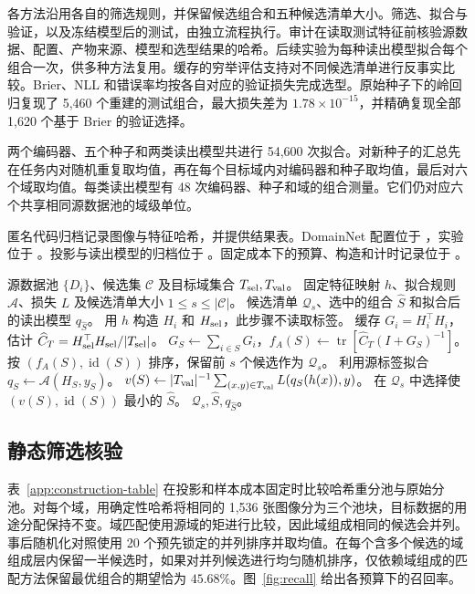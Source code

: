 \documentclass[UTF8,fontset=fandol,scheme=chinese,zihao=false,11pt,letterpaper]{ctexart}
\newcommand{\tr}{\operatorname{tr}}
\newcommand{\cC}{\mathcal{C}}
\newcommand{\cQ}{\mathcal{Q}}
\begin{document}
各方法沿用各自的筛选规则，并保留候选组合和五种候选清单大小。筛选、拟合与验证，以及冻结模型后的测试，由独立流程执行。审计在读取测试特征前核验源数据、配置、产物来源、模型和选型结果的哈希。后续实验为每种读出模型拟合每个组合一次，供多种方法复用。缓存的穷举评估支持对不同候选清单进行反事实比较。Brier、NLL 和错误率均按各自对应的验证损失完成选型。原始种子下的岭回归复现了 5,460 个重建的测试组合，最大损失差为 $1.78\times10^{-15}$，并精确复现全部 1,620 个基于 Brier 的验证选择。

两个编码器、五个种子和两类读出模型共进行 54,600 次拟合。对新种子的汇总先在任务内对随机重复取均值，再在每个目标域内对编码器和种子取均值，最后对六个域取均值。每类读出模型有 48 次编码器、种子和域的组合测量。它们仍对应六个共享相同源数据池的域级单位。

匿名代码归档记录图像与特征哈希，并提供结果表。DomainNet 配置位于 ，实验位于 。投影与读出模型的归档位于 。固定成本下的预算、构造和计时记录位于 。

\begin{algorithm}[htbp]
\caption{Target A-opt 筛选与验证}
\label{alg:target-a}
\begin{algorithmic}[1]
\Require 源数据池 $\{D_i\}$、候选集 $\cC$ 及目标域集合 $T_{\rm sel},T_{\rm val}$。
\Require 固定特征映射 $h$、拟合规则 $\mathcal A$、损失 $L$ 及候选清单大小 $1\leq s\leq|\cC|$。
\Ensure 候选清单 $\cQ_s$、选中的组合 $\widehat S$ 和拟合后的读出模型 $q_{\widehat S}$。
\State 用 $h$ 构造 $H_i$ 和 $H_{\rm sel}$，此步骤不读取标签。
\State 缓存 $G_i=H_i^\top H_i$，估计 $\widehat C_T=H_{\rm sel}^\top H_{\rm sel}/|T_{\rm sel}|$。
\For{每个 $S\in\cC$}
  \State $G_S\gets\sum_{i\in S}G_i$，$f_A(S)\gets\tr\!\left[\widehat C_T(I+G_S)^{-1}\right]$。
\EndFor
\State 按 $(f_A(S),\operatorname{id}(S))$ 排序，保留前 $s$ 个候选作为 $\cQ_s$。
\For{每个 $S\in\cQ_s$}
  \State 利用源标签拟合 $q_S\gets\mathcal A(H_S,y_S)$。
  \State $v(S)\gets |T_{\rm val}|^{-1}\sum_{(x,y)\in T_{\rm val}}L(q_S(h(x)),y)$。
\EndFor
\State 在 $\cQ_s$ 中选择使 $(v(S),\operatorname{id}(S))$ 最小的 $\widehat S$。
\State \Return $\cQ_s,\widehat S,q_{\widehat S}$。
\end{algorithmic}
\end{algorithm}

\subsection{静态筛选核验}
\label{app:diagnostics}
表~\ref{app:construction-table} 在投影和样本成本固定时比较哈希重分池与原始分池。对每个域，用确定性哈希将相同的 1,536 张图像分为三个池块，目标数据的用途分配保持不变。域匹配使用源域的矩进行比较，因此域组成相同的候选会并列。事后随机化对照使用 20 个预先锁定的并列排序并取均值。在每个含多个候选的域组成层内保留一半候选时，如果对并列候选进行均匀随机排序，仅依赖域组成的匹配方法保留最优组合的期望恰为 $45.68\%$。图~\ref{fig:recall} 给出各预算下的召回率。
\end{document}
